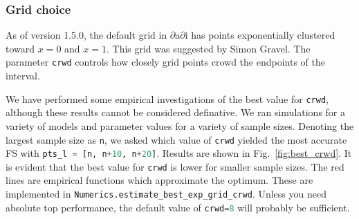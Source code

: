 \documentclass[12pt]{article}
\makeatletter
\newcommand{\dadi}{$\partial$a$\partial$i\xspace}
\newcommand{\py}[1]{\lstinline[language=Python, showstringspaces=False]@#1@}
\makeatother
\begin{document}
\subsubsection{Grid choice}
As of version 1.5.0, the default grid in \dadi has points exponentially clustered toward $x=0$ and $x=1$.
This grid was suggested by Simon Gravel.
The parameter \py{crwd} controls how closely grid points crowd the endpoints of the interval.

We have performed some empirical investigations of the best value for \py{crwd}, although these results cannot be considered definative.
We ran simulations for a variety of models and parameter values for a variety of sample sizes.
Denoting the largest sample size as \py{n}, we asked which value of \py{crwd} yielded the most accurate FS with \py{pts_l = [n, n+10, n+20]}.
Results are shown in Fig.~\ref{fig:best_crwd}.
It is evident that the best value for \py{crwd} is lower for smaller sample sizes.
The red lines are empirical functions which approximate the optimum.
These are implemented in \py{Numerics.estimate_best_exp_grid_crwd}.
Unless you need absolute top performance, the default value of \py{crwd=8} will probably be sufficient.
\end{document}
